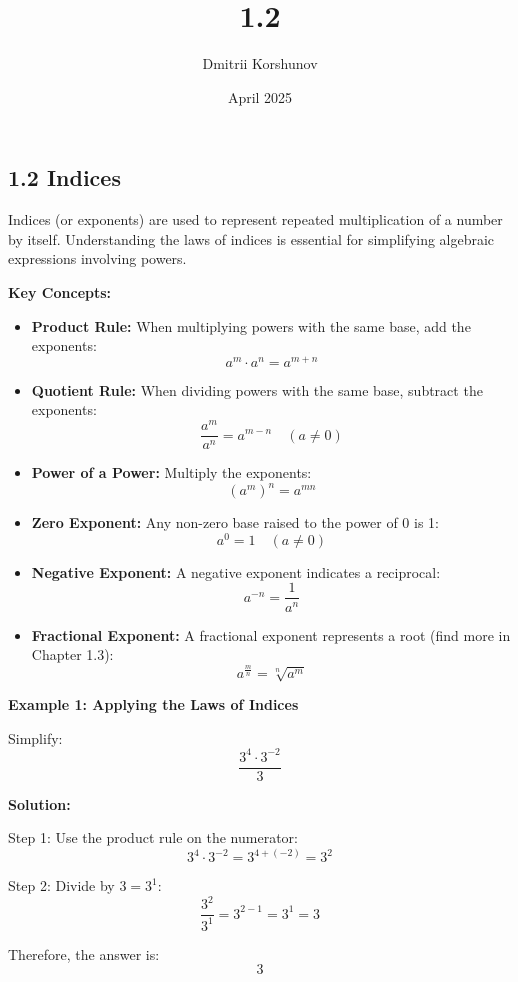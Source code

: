 \documentclass{article}
\title{1.2}
\author{Dmitrii Korshunov}
\date{April 2025}
\begin{document}
\subsection*{1.2 Indices}

Indices (or exponents) are used to represent repeated multiplication of a number by itself. Understanding the laws of indices is essential for simplifying algebraic expressions involving powers.

\textbf{Key Concepts:}

\begin{itemize}
    \item \textbf{Product Rule:} When multiplying powers with the same base, add the exponents:
    \[
    a^m \cdot a^n = a^{m+n}
    \]

    \item \textbf{Quotient Rule:} When dividing powers with the same base, subtract the exponents:
    \[
    \frac{a^m}{a^n} = a^{m-n} \quad (a \neq 0)
    \]

    \item \textbf{Power of a Power:} Multiply the exponents:
    \[
    (a^m)^n = a^{mn}
    \]

    \item \textbf{Zero Exponent:} Any non-zero base raised to the power of 0 is 1:
    \[
    a^0 = 1 \quad (a \neq 0)
    \]

    \item \textbf{Negative Exponent:} A negative exponent indicates a reciprocal:
    \[
    a^{-n} = \frac{1}{a^n}
    \]

    \item \textbf{Fractional Exponent:} A fractional exponent represents a root (find more in Chapter 1.3):
    \[
    a^{\frac{m}{n}} = \sqrt[n]{a^m}
    \]
\end{itemize}

\begin{flushleft}
\textbf{Example 1: Applying the Laws of Indices}

Simplify:  
\[
\frac{3^4 \cdot 3^{-2}}{3}
\]

\textbf{Solution:} \vspace{0.2cm}

Step 1: Use the product rule on the numerator:  
\[
3^4 \cdot 3^{-2} = 3^{4 + (-2)} = 3^2
\]

Step 2: Divide by \(3 = 3^1\):  
\[
\frac{3^2}{3^1} = 3^{2-1} = 3^1 = 3
\]

Therefore, the answer is:  
\[
3
\]
\end{flushleft}
\end{document}
